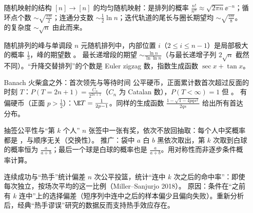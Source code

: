 \begin{结论}{随机映射的结构}
$[n]\to[n]$ 的均匀随机映射：是排列的概率 $\frac{n!}{n^n}\approx\sqrt{2\pi n}\ee^{-n}$；循环点个数 $\sim\sqrt{\frac{\pi n}2}$；连通分支数 $\sim\frac12\ln n$；迭代轨道的尾长与圈长期望均 $\sim\sqrt{\frac{\pi n}8}$。
的复杂度 $\sim\sqrt n$ 由此而来。
\end{结论}

\begin{结论}{随机排列的峰与单调段}
$n$ 元随机排列中，内部位置 $i$（$2\le i\le n-1$）是局部极大的概率 $\frac13$，峰的期望数 。
最长递增段的期望 $\sim\frac{\ln n}{\ln\ln n}$（与最长递增子列 $2\sqrt n$ 截然不同）。“升降交替排列”的个数是 Euler zigzag 数，指数生成函数 $\sec x+\tan x$。
\end{结论}

\begin{结论}{Banach 火柴盒之外：首次领先与等待时间}
公平硬币，正面累计数首次超过反面的时刻 $T$：$P(T=2n+1)=\frac{C_n}{2^{2n+1}}$（$C_n$ 为 Catalan 数），$P(T<\infty)=1$ 但 。
有偏硬币（正面 $p>\frac12$）：$\E T=\frac{1}{2p-1}$。同样的生成函数 $\frac{1-\sqrt{1-4pqs^2}}{2qs}$ 给出所有首达分布。
\end{结论}

\begin{结论}{抽签公平性与“第 $k$ 个人”}
$n$ 张签中一张有奖，依次不放回抽取：每个人中奖概率都是 ，与顺序无关（交换性）。
推广：袋中 $a$ 白 $b$ 黑依次取出，第 $k$ 次取到白球的概率恒为 $\frac{a}{a+b}$；最后一个球是白球的概率也是 $\frac a{a+b}$。用对称性而非逐步条件概率计算。
\end{结论}

\begin{结论}{连续成功与“热手”统计偏差}
$n$ 次公平投篮，统计“连中 $k$ 次之后的命中率”：即使每次独立，按场次平均的这一比例（Miller--Sanjurjo 2018）。
原因：条件在“之前有 $k$ 连中”上的选择偏差（短序列中连中之后的样本偏少且偏向失败）。重新分析后，经典“热手谬误”研究的数据反而支持热手效应存在。
\end{结论}

